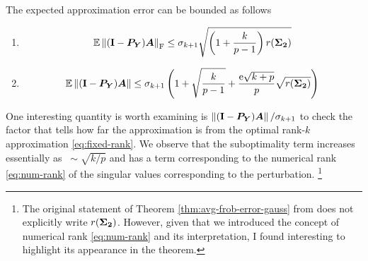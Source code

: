 \begin{theorem} \label{thm:avg-frob-error-gauss}
The expected approximation error can be bounded as follows
\begin{enumerate}
  \item
$$
\operatorname{\mathbb{E}} \left\Vert {(\mathbf{I}- \bm{P}_{\bm{Y}}) \bm{A}} \right\Vert_{\mathrm{F}}
    \leq \sigma_{k+1}\sqrt{\left( 1 + \frac{k}{p-1} \right)r(\bm{\Sigma_2})}
$$
\item 
$$
\operatorname{\mathbb{E}} \left\Vert {(\mathbf{I}- \bm{P}_{\bm{Y}}) \bm{A}} \right\Vert
    \leq  \sigma_{k+1}\left(1 + \sqrt{\frac{k}{p-1}}
    +  \frac{\mathrm{e}\sqrt{k+p}}{p}\sqrt{r(\bm{\Sigma_2})}\right)
$$
 \end{enumerate}
\end{theorem}
One interesting quantity is worth examining is
$\left\Vert {(\mathbf{I}- \bm{P}_{\bm{Y}}) \bm{A}} \right\Vert/\sigma_{k+1}$ to check
the factor that tells how far the
approximation is from the optimal rank-$k$ approximation \ref{eq:fixed-rank}.
We observe that the suboptimality term increases
essentially as $~\sim\sqrt{k/p}$ and has a term corresponding to the 
numerical rank \ref{eq:num-rank} of the singular values corresponding
to the perturbation.
\footnote{The original statement of Theorem \ref{thm:avg-frob-error-gauss}
from \cite{halko2011finding} does not explicitly write $r(\bm{\Sigma_2})$.
However, given that we introduced the concept of numerical rank 
\ref{eq:num-rank} and its interpretation, I found interesting to highlight its
appearance in the theorem.}

